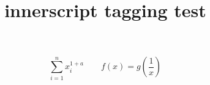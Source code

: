 \documentclass{article}
\title{innerscript tagging test}
\begin{document}
\[
\sum_{i=1}^n{}
x_i^{1+a}
\qquad
f(x)=g\left(\frac1x\right)
\]
\end{document}
